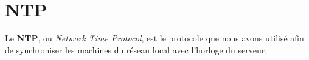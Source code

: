 \section{NTP}
\label{sec:ntp}

Le \textbf{NTP}, ou \textit{Network Time Protocol}, est le protocole que nous
avons utilisé afin de synchroniser les machines du réseau local avec l'horloge
du serveur.
